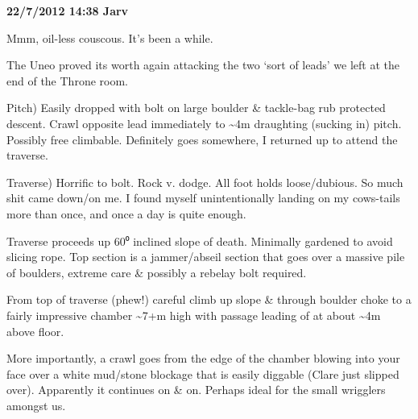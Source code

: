 \textbf{22/7/2012 14:38 Jarv}

Mmm, oil-less couscous. It's been a while.

The Uneo proved its worth again attacking the two `sort of leads' we
left at the end of the Throne room.

Pitch) Easily dropped with bolt on large boulder \& tackle-bag rub
protected descent. Crawl opposite lead immediately to
\textasciitilde{}4m draughting (sucking in) pitch. Possibly free
climbable. Definitely goes somewhere, I returned up to attend the
traverse.

Traverse) Horrific to bolt. Rock v. dodge. All foot holds loose/dubious.
So much shit came down/on me. I found myself unintentionally landing on
my cows-tails more than once, and once a day is quite enough.

Traverse proceeds up 60⁰ inclined slope of death. Minimally gardened to
avoid slicing rope. Top section is a jammer/abseil section that goes
over a massive pile of boulders, extreme care \& possibly a rebelay bolt
required.

From top of traverse (phew!) careful climb up slope \& through boulder
choke to a fairly impressive chamber \textasciitilde{}7+m high with
passage leading of at about \textasciitilde{}4m above floor.

More importantly, a crawl goes from the edge of the chamber blowing into
your face over a white mud/stone blockage that is easily diggable (Clare
just slipped over). Apparently it continues on \& on. Perhaps ideal for
the small wrigglers amongst us.

